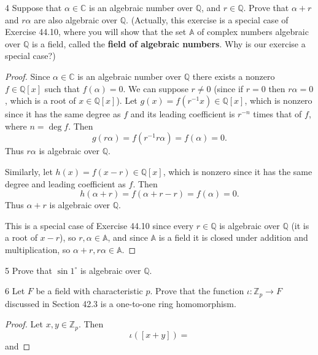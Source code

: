 \begin{problem}{4}
    Suppose that $\alpha \in \mathbb{C}$ is an algebraic number over
    $\mathbb{Q}$, and $r \in \mathbb{Q}$. Prove that $\alpha + r$ and
    $r\alpha$ are also algebraic over $\mathbb{Q}$. (Actually, this exercise
    is a special case of Exercise 44.10, where you will show that the set
    $\mathbb{A}$ of complex numbers algebraic over $\mathbb{Q}$ is a field,
    called the \textbf{field of algebraic numbers}. Why is our exercise a
    special case?)
\end{problem}
\solved
 
\begin{proof}
    Since $\alpha \in \mathbb{C}$ is an algebraic number over
    $\mathbb{Q}$ there exists a nonzero $f \in \mathbb{Q}[x]$ such that $f(\alpha) = 0$.
    We can suppose $r \ne 0$ (since if $r = 0$ then $r \alpha = 0$, which is a root of $x \in \mathbb{Q}[x]$).
    Let $g(x) = f(r^{-1}x) \in \mathbb{Q}[x]$, which is nonzero since it has the same degree as $f$
    and its leading coefficient is $r^{-n}$ times that of $f$, where $n = \deg f$. Then
    \[g(r \alpha) = f(r^{-1} r \alpha) = f(\alpha) = 0.\]
    Thus $r \alpha$ is algebraic over $\mathbb{Q}$.

    Similarly, let $h(x) = f(x - r) \in \mathbb{Q}[x]$, which is nonzero since it has the same
    degree and leading coefficient as $f$. Then
    \[h(\alpha + r) = f(\alpha + r - r) = f(\alpha) = 0.\]
    Thus $\alpha + r$ is algebraic over $\mathbb{Q}$.

    This is a special case of Exercise 44.10 since every $r \in \mathbb{Q}$ is algebraic over
    $\mathbb{Q}$ (it is a root of $x - r$), so $r, \alpha \in \mathbb{A}$, and since $\mathbb{A}$ is a
    field it is closed under addition and multiplication, so $\alpha + r, r\alpha \in \mathbb{A}$.
\end{proof}

\begin{problem}{5}
    Prove that $\sin 1^\circ$ is algebraic over $\mathbb{Q}$.
\end{problem}
\unsolved

\begin{problem}{6}
    Let $F$ be a field with characteristic $p$. Prove that the function
    $\iota : \mathbb{Z}_p \to F$ discussed in Section 42.3 is a one-to-one
    ring homomorphism.
\end{problem}
\unsolved

\begin{proof}
    Let $x, y \in \mathbb{Z}_p$.
    Then 
    \[\iota([x + y]) = \]
    and 
\end{proof}

